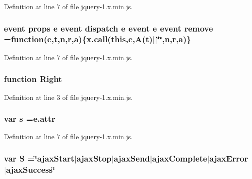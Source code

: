 Definition at line 7 of file jquery-\/1.\+x.\+min.\+js.

\subsubsection[{\texorpdfstring{remove}{remove}}]{ event props {\bf e} event dispatch {\bf e} event {\bf e} event remove =function({\bf e},{\bf t},{\bf n},r,{\bf a})\{x.\+call({\bf this},{\bf e},{\bf A}({\bf t})$\vert$$\vert$\char`\"{}\char`\"{},{\bf n},r,{\bf a})\}}\hypertarget{jquery-1_8x_8min_8js_a4a5dfe91371a8a51afa69bcd5fddaac3}{}\label{jquery-1_8x_8min_8js_a4a5dfe91371a8a51afa69bcd5fddaac3}


Definition at line 7 of file jquery-\/1.\+x.\+min.\+js.

\subsubsection[{\texorpdfstring{Right}{Right}}]{\setlength{\rightskip}{0pt plus 5cm}function Right}\hypertarget{jquery-1_8x_8min_8js_ac7f66efc33d974809d85fc5bdb00c6eb}{}\label{jquery-1_8x_8min_8js_ac7f66efc33d974809d85fc5bdb00c6eb}


Definition at line 3 of file jquery-\/1.\+x.\+min.\+js.

\subsubsection[{\texorpdfstring{s}{s}}]{\setlength{\rightskip}{0pt plus 5cm}var s ={\bf e.\+attr}}\hypertarget{jquery-1_8x_8min_8js_ad9a7d92cb87932d25187fdec3ba1b621}{}\label{jquery-1_8x_8min_8js_ad9a7d92cb87932d25187fdec3ba1b621}


Definition at line 7 of file jquery-\/1.\+x.\+min.\+js.

\subsubsection[{\texorpdfstring{S}{S}}]{\setlength{\rightskip}{0pt plus 5cm}var S =\char`\"{}ajax\+Start$\vert$ajax\+Stop$\vert$ajax\+Send$\vert$ajax\+Complete$\vert$ajax\+Error$\vert$ajax\+Success\char`\"{}}\hypertarget{jquery-1_8x_8min_8js_a8bab16140cede5f71c657e8dc46c1887}{}\label{jquery-1_8x_8min_8js_a8bab16140cede5f71c657e8dc46c1887}


